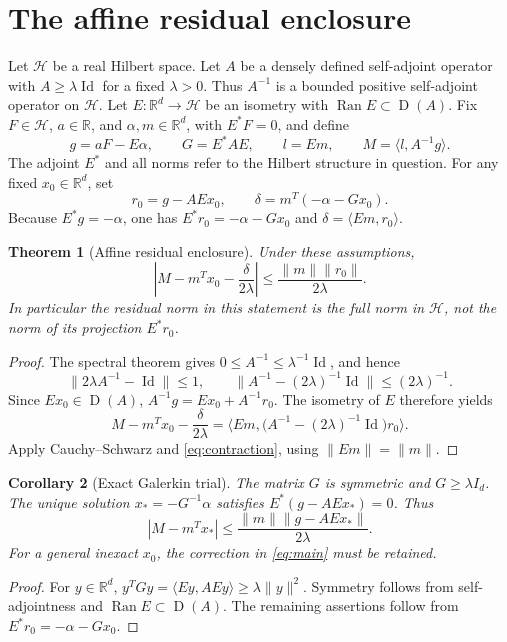 \documentclass[11pt,a4paper]{article}
\newcommand{\R}{\mathbb R}
\newcommand{\HH}{\mathcal H}
\newcommand{\Id}{\operatorname{Id}}
\newcommand{\Ran}{\operatorname{Ran}}
\newcommand{\Dom}{\operatorname{D}}
\newcommand{\ip}[2]{\langle #1,#2\rangle}
\newcommand{\norm}[1]{\lVert #1\rVert}
\newtheorem{theorem}{Theorem}[section]
\newtheorem{corollary}[theorem]{Corollary}
\theoremstyle{remark}
\numberwithin{equation}{section}
\begin{document}
\section{The affine residual enclosure}\label{sec:abstract}
Let $\HH$ be a real Hilbert space. Let $A$ be a densely defined self-adjoint
operator with $A\ge\lambda\Id$ for a fixed $\lambda>0$. Thus $A^{-1}$ is a
bounded positive self-adjoint operator on $\HH$. Let
$E:\R^d\to\HH$ be an isometry with $\Ran E\subset\Dom(A)$. Fix
$F\in\HH$, $a\in\R$, and $\alpha,m\in\R^d$, with $E^*F=0$, and define
\begin{equation}\label{eq:abstract-data}
 g=aF-E\alpha,\qquad G=E^*AE,\qquad
 l=Em,\qquad M=\ip{l}{A^{-1}g}.
\end{equation}
The adjoint $E^*$ and all norms refer to the Hilbert structure in question.
For any fixed $x_0\in\R^d$, set
\begin{equation}\label{eq:residual}
 r_0=g-AEx_0,\qquad
 \delta=m^T(-\alpha-Gx_0).
\end{equation}
Because $E^*g=-\alpha$, one has $E^*r_0=-\alpha-Gx_0$ and
$\delta=\ip{Em}{r_0}$.

\begin{theorem}[Affine residual enclosure]\label{thm:affine}
Under these assumptions,
\begin{equation}\label{eq:main}
 \boxed{\left|M-m^Tx_0-\frac{\delta}{2\lambda}\right|
 \le\frac{\norm{m}\norm{r_0}}{2\lambda}.}
\end{equation}
In particular the residual norm in this statement is the full norm in
$\HH$, not the norm of its projection $E^*r_0$.
\end{theorem}
\begin{proof}
The spectral theorem gives
$0\le A^{-1}\le\lambda^{-1}\Id$, and hence
\begin{equation}\label{eq:contraction}
 \norm{2\lambda A^{-1}-\Id}\le1,
 \qquad
 \norm{A^{-1}-(2\lambda)^{-1}\Id}\le(2\lambda)^{-1}.
\end{equation}
Since $Ex_0\in\Dom(A)$,
$A^{-1}g=Ex_0+A^{-1}r_0$. The isometry of $E$ therefore yields
\[
 M-m^Tx_0-\frac{\delta}{2\lambda}
 =\ip{Em}{\bigl(A^{-1}-(2\lambda)^{-1}\Id\bigr)r_0}.
\]
Apply Cauchy--Schwarz and \eqref{eq:contraction}, using
$\norm{Em}=\norm{m}$.
\end{proof}

\begin{corollary}[Exact Galerkin trial]\label{cor:galerkin}
The matrix $G$ is symmetric and $G\ge\lambda I_d$. The unique solution
$x_*=-G^{-1}\alpha$ satisfies $E^*(g-AEx_*)=0$. Thus
\begin{equation}\label{eq:galerkin}
 \left|M-m^Tx_*\right|
 \le\frac{\norm{m}\norm{g-AEx_*}}{2\lambda}.
\end{equation}
For a general inexact $x_0$, the correction in \eqref{eq:main} must be retained.
\end{corollary}
\begin{proof}
For $y\in\R^d$,
$y^TGy=\ip{Ey}{AEy}\ge\lambda\norm{y}^2$. Symmetry follows from
self-adjointness and $\Ran E\subset\Dom(A)$. The remaining assertions
follow from $E^*r_0=-\alpha-Gx_0$.
\end{proof}
\end{document}
